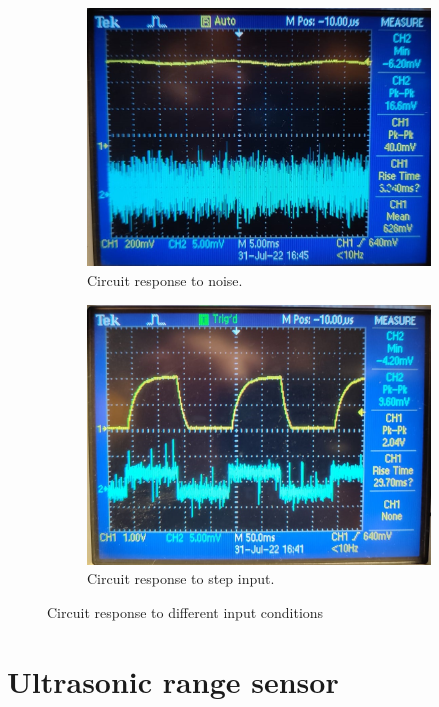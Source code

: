 \begin{figure}[H]
\begin{subfigure}[]{0.3\textwidth}
\includegraphics[width=\linewidth]{./Figures/CurSens_Prac_Noise.jpeg}
\caption{Circuit response to noise.}
\label{subfig:cursen_prac_noise}	
\end{subfigure}
\hfill
\begin{subfigure}[]{0.3\textwidth}
\includegraphics[width=\linewidth]{./Figures/CurSens_Prac_Step.jpeg}
\caption{Circuit response to step input.} 			
\label{subfig:cursen_prac_step}	
\end{subfigure}
\caption{Circuit response to different input conditions}
\label{fig:cursen_prac_resp}
\end{figure}

\clearpage
\section{Ultrasonic range sensor}
